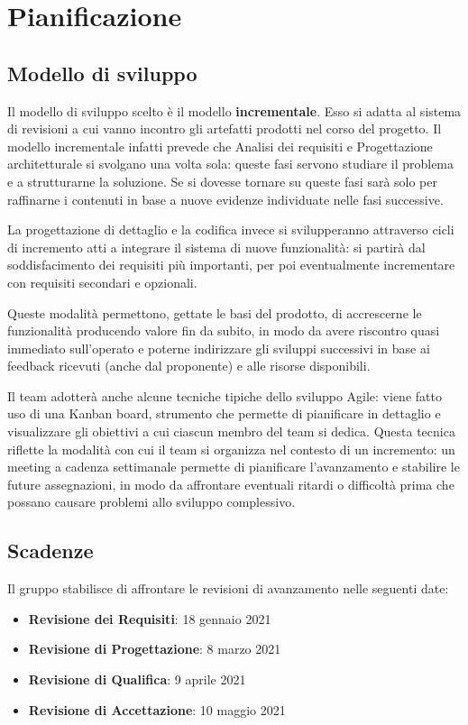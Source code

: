 \section{Pianificazione}

\subsection{Modello di sviluppo}

Il modello di sviluppo scelto è il modello \textbf{incrementale}. Esso si adatta al sistema di revisioni a cui vanno incontro gli artefatti prodotti nel corso del progetto. Il modello incrementale infatti prevede che Analisi dei requisiti e Progettazione architetturale si svolgano una volta sola: queste fasi servono studiare il problema e a strutturarne la soluzione. Se si dovesse tornare su queste fasi sarà solo per raffinarne i contenuti in base a nuove evidenze individuate nelle fasi successive.

La progettazione di dettaglio e la codifica invece si svilupperanno attraverso cicli di incremento atti a integrare il sistema di nuove funzionalità: si partirà dal soddisfacimento dei requisiti più importanti, per poi eventualmente incrementare con requisiti secondari e opzionali. 

Queste modalità permettono, gettate le basi del prodotto, di accrescerne le funzionalità producendo valore fin da subito, in modo da avere riscontro quasi immediato sull'operato e poterne indirizzare gli sviluppi successivi in base ai feedback ricevuti (anche dal proponente) e alle risorse disponibili.

Il team adotterà anche alcune tecniche tipiche dello sviluppo Agile: viene fatto uso di una Kanban board, strumento che permette di pianificare in dettaglio e visualizzare gli obiettivi a cui ciascun membro del team si dedica. Questa tecnica riflette la modalità con cui il team si organizza nel contesto di un incremento: un meeting a cadenza settimanale permette di pianificare l'avanzamento e stabilire le future assegnazioni, in modo da affrontare eventuali ritardi o difficoltà prima che possano causare problemi allo sviluppo complessivo.



\subsection{Scadenze}

Il gruppo stabilisce di affrontare le revisioni di avanzamento nelle seguenti date:
\begin{itemize}
	\item \textbf{Revisione dei Requisiti}: 18 gennaio 2021
	\item \textbf{Revisione di Progettazione}: 8 marzo 2021 
	\item \textbf{Revisione di Qualifica}: 9 aprile 2021
	\item \textbf{Revisione di Accettazione}: 10 maggio 2021	
\end{itemize}





